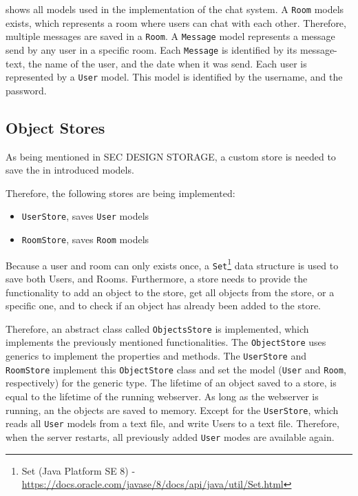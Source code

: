 shows all models used in the implementation of the chat system.
A \texttt{Room} models exists, which represents a room where users can chat with each other. Therefore, multiple messages are saved in a \texttt{Room}. A \texttt{Message} model represents a message send by any user in a specific room. Each \texttt{Message} is identified by its message-text, the name of the user, and the date when it was send.
Each user is represented by a \texttt{User} model. This model is identified by the username, and the password.


\subsection{Object Stores}\label{subsec:03_impl_objstores}
As being mentioned in SEC DESIGN STORAGE, a custom store is needed to save the in  introduced models.

Therefore, the following stores are being implemented:
\begin{itemize}
\item \texttt{UserStore}, saves \texttt{User} models
\item \texttt{RoomStore}, saves \texttt{Room} models
\end{itemize}
Because a user and room can only exists once, a \texttt{Set}\footnote{Set (Java Platform SE 8) - \url{https://docs.oracle.com/javase/8/docs/api/java/util/Set.html}} data structure is used to save both Users, and Rooms. Furthermore, a store needs to provide the functionality to add an object to the store, get all objects from the store, or a specific one, and to check if an object has already been added to the store.


Therefore, an abstract class called \texttt{ObjectsStore} is implemented, which implements the previously mentioned functionalities.
The \texttt{ObjectStore} uses generics to implement the properties and methods. The \texttt{UserStore} and \texttt{RoomStore} implement this \texttt{ObjectStore} class and set the model (\texttt{User} and \texttt{Room}, respectively) for the generic type.
The lifetime of an object saved to a store, is equal to the lifetime of the running webserver. As long as the webserver is running, an the objects are saved to memory.
Except for the \texttt{UserStore}, which reads all \texttt{User} models from a text file, and write Users to a text file. Therefore, when the server restarts, all previously added \texttt{User} modes are available again.

